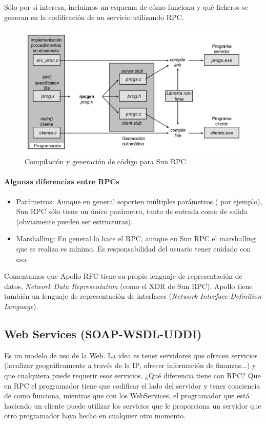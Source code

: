 Sólo por si interesa, incluimos un esquema de cómo funciona y qué ficheros se generan en la codificación de un servicio utilizando RPC.


\begin{figure}[htb]
\centering
\includegraphics[width=1\textwidth]{img/SUNRPC.png}
\caption{Compilación y generación de código para Sun RPC.}
\label{SunRPC}
\end{figure}

\paragraph{Algunas diferencias entre RPCs}
\begin{itemize}
	\item Parámetros: Aunque en general soporten múltiples parámetros ( por ejemplo), Sun RPC sólo tiene un único parámetro, tanto de entrada como de salida (obviamente pueden ser estructuras).
	\item Marshalling: En general lo hace el RPC, aunque en Sun RPC el marshalling que se realiza es mínimo. Es responsabilidad del usuario tener cuidado con eso.
\end{itemize}

Comentamos que Apollo RFC tiene su propio lenguaje de representación de datos, \textit{Network Data Representation}  (como el XDR de Sun RPC). Apollo tiene también un lenguaje de representación de interfaces  (\textit{Network Interface Definition Language}).

\subsection{Web Services (SOAP-WSDL-UDDI)}
Es un modelo de uso de la Web. La idea es tener servidores que ofrecen servicios (localizar geográficamente a través de la IP, ofrecer información de finanzas...) y que cualquiera puede requerir esos servicios. ¿Qué diferencia tiene con RPC? Que en RPC el programador tiene que codificar el lado del servidor y tener conciencia de como funciona, mientras que con los WebServices, el programador que está haciendo un cliente puede utilizar los servicios que le proporciona un servidor que otro programador haya hecho en cualquier otro momento.

